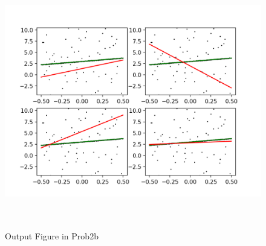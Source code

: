 \documentclass{article}
\begin{document}
\begin{figure}[htbp]
  \centering
  \includegraphics[height = 30em]{./code/outputs/prob2b.png}
  \caption{Output Figure in Prob2b}
  \label{fig:prob2b}
\end{figure}
\end{document}
